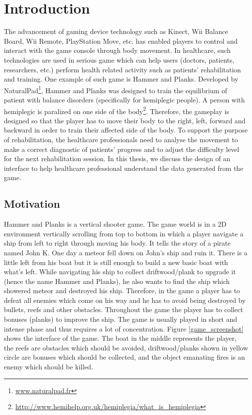 \chapter{Introduction}
\label{chap:intro}

The advancement of gaming device technology such as Kinect, Wii Balance Board, Wii Remote, PlayStation Move, etc. has enabled players to control and interact with the game console through body movement. In healthcare, such technologies are used in serious game which can help users (doctors, patients, researchers, etc.)  perform health related activity such as patients' rehabilitation and training\cite{rahman,brezinka,green}. One example of such game is Hammer and Planks. Developed by NaturalPad\footnote{\url{www.naturalpad.fr}}, Hammer and Planks was designed to train the equilibrium of patient with balance disorders (specifically for hemiplegic people)\cite{diloreto}. A person with hemiplegic is paralized on one side of the body\footnote{\url{http://www.hemihelp.org.uk/hemiplegia/what_is_hemiplegia}}. Therefore, the gameplay is designed so that the player has to move their body to the right, left, forward and backward in order to train their affected side of the body. To support the purpose of rehabilitation, the healthcare professionals need to analyse the movement to  make a correct diagnostic of patients' progress and to adjust the difficulty level for the next rehabilitation session. In this thesis, we discuss the design of an interface to help healthcare professional understand the data generated from the game.

\section{Motivation}

Hammer and Planks is a vertical shooter game. The game world is in a 2D environment vertically scrolling from top to bottom in which a player navigate a ship from left to right through moving his body. It tells the story of a pirate named John K. One day a meteor fell down on John's ship and ruin it. There is a little left from his boat but it is still enough to build a new basic boat with what's left. While navigating his ship to collect driftwood/plank to upgrade it (hence the name Hammer and Planks), he also wants to find the ship which showered meteor and destroyed his ship. Therefore, in the game a player has to defeat all enemies which come on his way and he has to avoid being destroyed by bullets, reefs and other obstacles. Throughout the game the player has to collect bonuses (planks) to improve the ship. The game is usually played in short and intense phase and thus requires a lot of concentration\cite{diloreto}. Figure \ref{game_screenshot} shows the interface of the game. The boat in the middle represents the player, the reefs are obstacles which should be avoided, driftwood/planks shown in yellow circle are bonuses which should be collected, and the object emanating fires is an enemy which should be killed.

